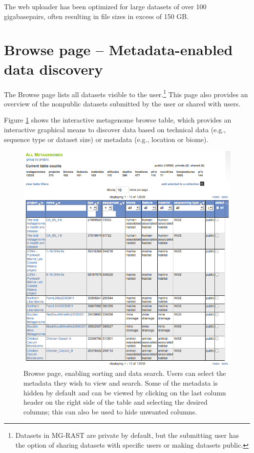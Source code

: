 \documentclass[12pt,fullpage]{report}
\begin{document}
The web uploader has been optimized for large datasets of over 100 gigabasepairs, often resulting in file sizes in excess of 150 GB.




\section{Browse page -- Metadata-enabled data discovery}

The Browse page lists all datasets visible to the user.\footnote{Datasets in MG-RAST are private by default, but the submitting user has the option of sharing datasets with specific users or  making datasets public.}
This page also provides an overview of the nonpublic datasets submitted by the user or shared with users.

Figure \ref{fig:metagenome-browser} shows the interactive metagenome browse table, which provides an interactive graphical means to discover data based on technical data (e.g., sequence type or dataset size) or metadata (e.g., location or biome).

\begin{figure}
\begin{center}
\includegraphics[width=6in]{Images/metagenome-browser.png}
\end{center}
\caption{
Browse page, enabling sorting and data search. Users can select the metadata they wish to view and search. Some of the metadata is hidden by default and can be viewed by clicking on the last column header on the right side of the table and selecting the desired columns; this can also be used to hide unwanted columns.
}
\label{fig:metagenome-browser}
\end{figure}
\end{document}
